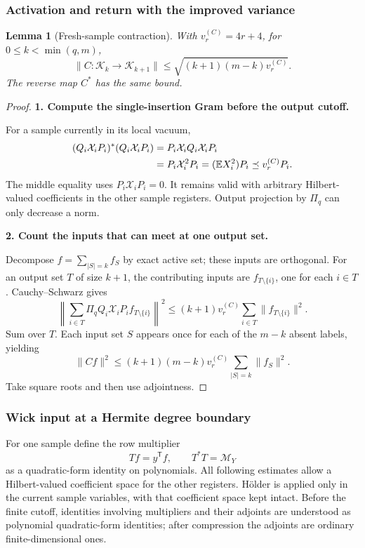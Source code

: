\documentclass[11pt]{article}
\numberwithin{equation}{section}
\newtheorem{lemma}[theorem]{Lemma}
\theoremstyle{definition}\newtheorem{definition}[theorem]{Definition}
\theoremstyle{remark}\newtheorem{remark}[theorem]{Remark}
\newcommand{\norm}[1]{\lVert#1\rVert}\newcommand{\ip}[2]{\langle#1,#2\rangle}
\newcommand{\step}[1]{\par\addvspace{.65\baselineskip}\Needspace{4\baselineskip}\noindent\textbf{#1}\par\nobreak\smallskip}
\begin{document}
\subsubsection{Activation and return with the improved variance}
\begin{lemma}[Fresh-sample contraction]\label{c:lem:fresh}
With $v_r^{(C)}=4r+4$, for $0\le k<\min(q,m)$,
\begin{equation}\label{c:eq:fresh}
 \norm{C:\mathcal K_k\to\mathcal K_{k+1}}
 \le\sqrt{(k+1)(m-k)v_r^{(C)}}.
\end{equation}
The reverse map $C^*$ has the same bound.
\end{lemma}
\begin{proof}
\step{1. Compute the single-insertion Gram before the output cutoff.}
For a sample currently in its local vacuum,
\begin{align*}
 (Q_i\mathcal X_iP_i)^*(Q_i\mathcal X_iP_i)
 &=P_i\mathcal X_iQ_i\mathcal X_iP_i\\
 &=P_i\mathcal X_i^2P_i
 = (\mathbb E X_i^2)P_i\preceq v_r^{(C)}P_i.
\end{align*}
The middle equality uses $P_i\mathcal X_iP_i=0$.
It remains valid with arbitrary Hilbert-valued coefficients in the other sample
registers. Output projection by $\Pi_q$ can only decrease a norm.

\step{2. Count the inputs that can meet at one output set.}
Decompose $f=\sum_{|S|=k}f_S$ by exact active set; these inputs are orthogonal.
For an output set $T$ of size $k+1$, the contributing inputs are
$f_{T\setminus\{i\}}$, one for each $i\in T$. Cauchy--Schwarz gives
\[
 \left\|\sum_{i\in T}\Pi_q Q_i\mathcal X_iP_i f_{T\setminus\{i\}}\right\|^2
 \le(k+1)v_r^{(C)}\sum_{i\in T}\norm{f_{T\setminus\{i\}}}^2.
\]
Sum over $T$. Each input set $S$ appears once for each of the $m-k$ absent
labels, yielding
\[
 \norm{Cf}^2\le(k+1)(m-k)v_r^{(C)}\sum_{|S|=k}\norm{f_S}^2.
\]
Take square roots and then use adjointness.
\end{proof}

\subsubsection{Wick input at a Hermite degree boundary}
For one sample define the row multiplier
\[
 Tf=y^{\mathsf T}f,\qquad T^*T=\mathcal M_Y
\]
as a quadratic-form identity on polynomials. All following estimates allow a
Hilbert-valued coefficient space for the other registers. H\"older is applied
only in the current sample variables, with that coefficient space kept intact.
Before the finite cutoff, identities involving multipliers and their adjoints
are understood as polynomial quadratic-form identities; after compression the
adjoints are ordinary finite-dimensional ones.
\end{document}
